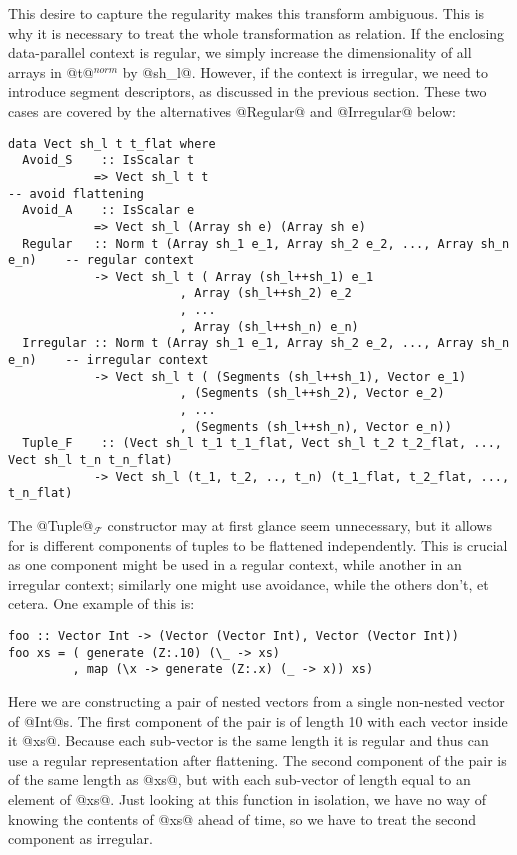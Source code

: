 This desire to capture the regularity makes this transform ambiguous. This is why it is necessary to treat the whole transformation as relation. If the enclosing data-parallel context is regular, we simply increase the dimensionality of all arrays in @t@$^{\textit{norm}}$ by @sh_l@. However, if the context is irregular, we need to introduce segment descriptors, as discussed in the previous section. These two cases are covered by the alternatives @Regular@ and @Irregular@ below:
%
\begin{lstlisting}[style=ndp]
data Vect sh_l t t_flat where
  Avoid_S    :: IsScalar t
            => Vect sh_l t t                                              -- avoid flattening
  Avoid_A    :: IsScalar e
            => Vect sh_l (Array sh e) (Array sh e)
  Regular   :: Norm t (Array sh_1 e_1, Array sh_2 e_2, ..., Array sh_n e_n)    -- regular context
            -> Vect sh_l t ( Array (sh_l++sh_1) e_1
                        , Array (sh_l++sh_2) e_2
                        , ...
                        , Array (sh_l++sh_n) e_n)
  Irregular :: Norm t (Array sh_1 e_1, Array sh_2 e_2, ..., Array sh_n e_n)    -- irregular context
            -> Vect sh_l t ( (Segments (sh_l++sh_1), Vector e_1)
                        , (Segments (sh_l++sh_2), Vector e_2)
                        , ...
                        , (Segments (sh_l++sh_n), Vector e_n))
  Tuple_F    :: (Vect sh_l t_1 t_1_flat, Vect sh_l t_2 t_2_flat, ..., Vect sh_l t_n t_n_flat)
            -> Vect sh_l (t_1, t_2, .., t_n) (t_1_flat, t_2_flat, ..., t_n_flat)
\end{lstlisting}
%
The @Tuple@$_\mathcal{F}$ constructor may at first glance seem unnecessary, but it allows for is different components of tuples to be flattened independently. This is crucial as one component might be used in a regular context, while another in an irregular context; similarly one might use avoidance, while the others don't, et cetera. One example of this is:
%
\begin{lstlisting}[style=ndp]
foo :: Vector Int -> (Vector (Vector Int), Vector (Vector Int))
foo xs = ( generate (Z:.10) (\_ -> xs)
         , map (\x -> generate (Z:.x) (_ -> x)) xs)
\end{lstlisting}
%
Here we are constructing a pair of nested vectors from a single non-nested vector of @Int@s. The first component of the pair is of length 10 with each vector inside it @xs@. Because each sub-vector is the same length it is regular and thus can use a regular representation after flattening. The second component of the pair is of the same length as @xs@, but with each sub-vector of length equal to an element of @xs@. Just looking at this function in isolation, we have no way of knowing the contents of @xs@ ahead of time, so we have to treat the second component as irregular.

